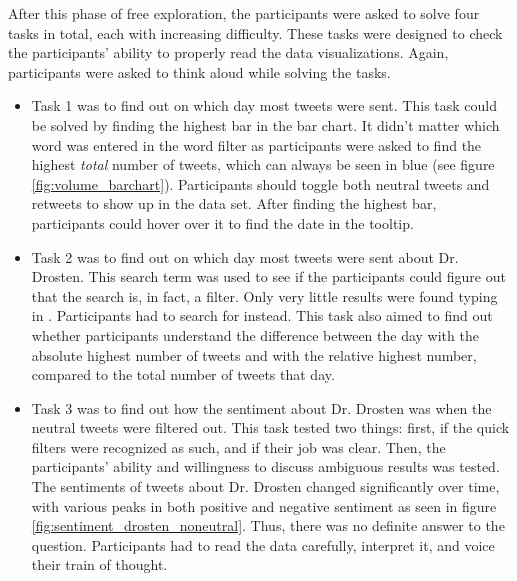 After this phase of free exploration, the participants were asked to solve four tasks in total, each with increasing difficulty. These tasks were designed to check the participants' ability to properly read the data visualizations. Again, participants were asked to think aloud while solving the tasks.
\begin{itemize}
    \item Task 1 was to find out on which day most tweets were sent. This task could be solved by finding the highest bar in the bar chart. It didn't matter which word was entered in the word filter as participants were asked to find the highest \emph{total} number of tweets, which can always be seen in blue (see figure \ref{fig:volume_barchart}). Participants should toggle both neutral tweets and retweets to show up in the data set. After finding the highest bar, participants could hover over it to find the date in the tooltip.
    \item Task 2 was to find out on which day most tweets were sent about Dr. Drosten. This search term was used to see if the participants could figure out that the search is, in fact, a filter. Only very little results were found typing in . Participants had to search for  instead. This task also aimed to find out whether participants understand the difference between the day with the absolute highest number of tweets and with the relative highest number, compared to the total number of tweets that day.
    \item Task 3 was to find out how the sentiment about Dr. Drosten was when the neutral tweets were filtered out. This task tested two things: first, if the quick filters were recognized as such, and if their job was clear. Then, the participants' ability and willingness to discuss ambiguous results was tested. The sentiments of tweets about Dr. Drosten changed significantly over time, with various peaks in both positive and negative sentiment as seen in figure \ref{fig:sentiment_drosten_noneutral}. Thus, there was no definite answer to the question. Participants had to read the data carefully, interpret it, and voice their train of thought.
    \begin{figure}[h!tb]

\end{figure}
\end{itemize}
